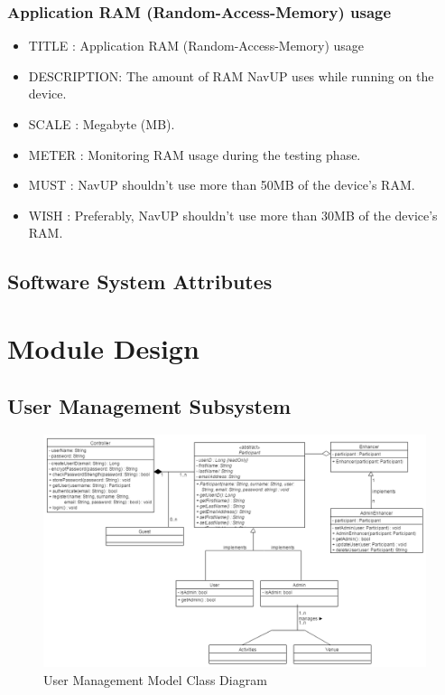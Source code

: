 \documentclass{article}
\begin{document}
		    \subsubsection{Application RAM (Random-Access-Memory) usage}
			\begin{itemize}
		    \item[]TITLE      : Application RAM (Random-Access-Memory) usage
		    \item[]DESCRIPTION: The amount of RAM NavUP uses while running on the device. 
		    \item[]SCALE      : Megabyte (MB).
		    \item[]METER      : Monitoring RAM usage during the testing phase.
		    \item[]MUST       : NavUP shouldn't use more than 50MB of the device's RAM.
		    \item[]WISH       : Preferably, NavUP shouldn't use more than 30MB of the device's RAM.
		    \end{itemize}
			\subsection{Software System Attributes}\label{subsec:attributes}

		\newpage

		\section{Module Design}\label{sec:moduels}	
      \subsection{User Management Subsystem}\label{subsec:users}
      	\begin{figure}[H]
			\includegraphics[scale=0.5]{Diagrams/User_Class_Diagram.png}
			\caption{User Management Model Class Diagram}
			\label{fig:User_class}
	\end{figure}
	
\end{document}

